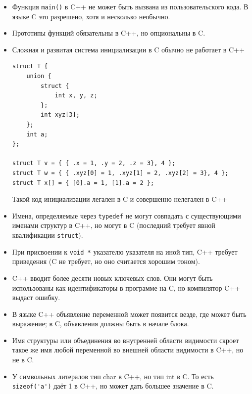 \documentclass[a4paper,12pt,oneside]{article}
\begin{document}
\begin{itemize}
\item
Функция \lstinline!main()! в C++ не может быть вызвана из пользовательского кода. В языке C это разрешено, хотя и несколько необычно.
\item
Прототипы функций обязательны в C++, но опциональны в C.
\item
Сложная и развитая система инициализации в C обычно не работает в C++

\begin{lstlisting}
struct T {
    union {
        struct {
            int x, y, z;
        };
        int xyz[3];
    };
    int a;
};

struct T v = { { .x = 1, .y = 2, .z = 3}, 4 };
struct T w = { { .xyz[0] = 1, .xyz[1] = 2, .xyz[2] = 3}, 4 };
struct T x[] = { [0].a = 1, [1].a = 2 };
\end{lstlisting}

Такой код инициализации легален в C и совершенно нелегален в C++
\item
Имена, определяемые через \lstinline!typedef! не могут совпадать с существующими именами структур в C++, но могут в C (последний требует явной квалификации \lstinline!struct!).
\item
При присвоении к \lstinline!void *! указателю указателя на иной тип, C++ требует приведения (C не требует, но оно считается хорошим тоном).
\item
C++ вводит более десяти новых ключевых слов. Они могут быть использованы как идентификаторы в программе на C, но компилятор C++ выдаст ошибку.
\item
В языке C++ объявление переменной может появится везде, где может быть выражение; в C, объявления должны быть в начале блока.
\item
Имя структуры или объединения во внутренней области видимости скроет такое же имя любой переменной во внешней области видимости в C++, но не в C.
\item
У символьных литералов тип char в C++, но тип int в C. То есть \lstinline!sizeof('a')! даёт 1 в C++, но может дать большее значение в C.
\end{itemize}

\pagebreak
\end{document}
